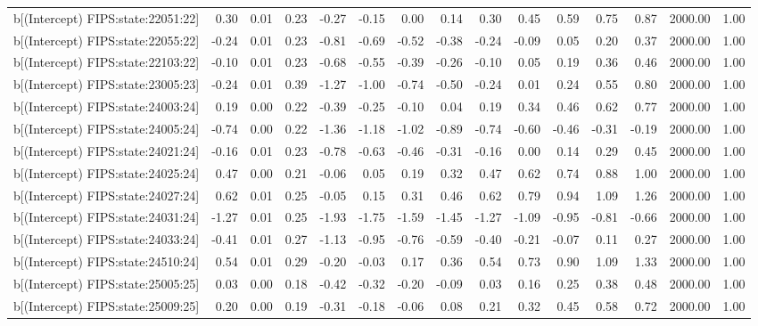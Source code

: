 \begin{table}[ht]
\begin{tabular}{rrrrrrrrrrrrrrr}
  b[(Intercept) FIPS:state:22051:22] & 0.30 & 0.01 & 0.23 & -0.27 & -0.15 & 0.00 & 0.14 & 0.30 & 0.45 & 0.59 & 0.75 & 0.87 & 2000.00 & 1.00 \\ 
  b[(Intercept) FIPS:state:22055:22] & -0.24 & 0.01 & 0.23 & -0.81 & -0.69 & -0.52 & -0.38 & -0.24 & -0.09 & 0.05 & 0.20 & 0.37 & 2000.00 & 1.00 \\ 
  b[(Intercept) FIPS:state:22103:22] & -0.10 & 0.01 & 0.23 & -0.68 & -0.55 & -0.39 & -0.26 & -0.10 & 0.05 & 0.19 & 0.36 & 0.46 & 2000.00 & 1.00 \\ 
  b[(Intercept) FIPS:state:23005:23] & -0.24 & 0.01 & 0.39 & -1.27 & -1.00 & -0.74 & -0.50 & -0.24 & 0.01 & 0.24 & 0.55 & 0.80 & 2000.00 & 1.00 \\ 
  b[(Intercept) FIPS:state:24003:24] & 0.19 & 0.00 & 0.22 & -0.39 & -0.25 & -0.10 & 0.04 & 0.19 & 0.34 & 0.46 & 0.62 & 0.77 & 2000.00 & 1.00 \\ 
  b[(Intercept) FIPS:state:24005:24] & -0.74 & 0.00 & 0.22 & -1.36 & -1.18 & -1.02 & -0.89 & -0.74 & -0.60 & -0.46 & -0.31 & -0.19 & 2000.00 & 1.00 \\ 
  b[(Intercept) FIPS:state:24021:24] & -0.16 & 0.01 & 0.23 & -0.78 & -0.63 & -0.46 & -0.31 & -0.16 & 0.00 & 0.14 & 0.29 & 0.45 & 2000.00 & 1.00 \\ 
  b[(Intercept) FIPS:state:24025:24] & 0.47 & 0.00 & 0.21 & -0.06 & 0.05 & 0.19 & 0.32 & 0.47 & 0.62 & 0.74 & 0.88 & 1.00 & 2000.00 & 1.00 \\ 
  b[(Intercept) FIPS:state:24027:24] & 0.62 & 0.01 & 0.25 & -0.05 & 0.15 & 0.31 & 0.46 & 0.62 & 0.79 & 0.94 & 1.09 & 1.26 & 2000.00 & 1.00 \\ 
  b[(Intercept) FIPS:state:24031:24] & -1.27 & 0.01 & 0.25 & -1.93 & -1.75 & -1.59 & -1.45 & -1.27 & -1.09 & -0.95 & -0.81 & -0.66 & 2000.00 & 1.00 \\ 
  b[(Intercept) FIPS:state:24033:24] & -0.41 & 0.01 & 0.27 & -1.13 & -0.95 & -0.76 & -0.59 & -0.40 & -0.21 & -0.07 & 0.11 & 0.27 & 2000.00 & 1.00 \\ 
  b[(Intercept) FIPS:state:24510:24] & 0.54 & 0.01 & 0.29 & -0.20 & -0.03 & 0.17 & 0.36 & 0.54 & 0.73 & 0.90 & 1.09 & 1.33 & 2000.00 & 1.00 \\ 
  b[(Intercept) FIPS:state:25005:25] & 0.03 & 0.00 & 0.18 & -0.42 & -0.32 & -0.20 & -0.09 & 0.03 & 0.16 & 0.25 & 0.38 & 0.48 & 2000.00 & 1.00 \\ 
  b[(Intercept) FIPS:state:25009:25] & 0.20 & 0.00 & 0.19 & -0.31 & -0.18 & -0.06 & 0.08 & 0.21 & 0.32 & 0.45 & 0.58 & 0.72 & 2000.00 & 1.00 \\ 

\end{tabular}
\end{table}

